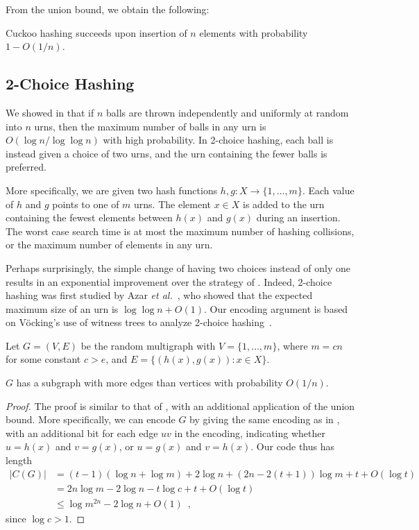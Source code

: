 \documentclass{patmorin}
\begin{document}
From the union bound, we obtain the following:
\begin{cor}
  Cuckoo hashing succeeds upon insertion of $n$ elements with
  probability $1 - O(1/n)$.
\end{cor}

\subsection{2-Choice Hashing}

We showed in  that if $n$ balls are thrown independently
and uniformly at random into $n$ urns, then the maximum number of
balls in any urn is $O(\log n/\log \log n)$ with high probability. In
2-choice hashing, each ball is instead given a choice of two urns, and
the urn containing the fewer balls is preferred.

More specifically, we are given two hash functions
$h, g : X \to \{1, \ldots, m\}$. Each value of $h$ and $g$ points to
one of $m$ urns. The element $x \in X$ is added to the urn containing
the fewest elements between $h(x)$ and $g(x)$ during an insertion. The
worst case search time is at most the maximum number of hashing
collisions, or the maximum number of elements in any urn.

Perhaps surprisingly, the simple change of having two choices instead
of only one results in an exponential improvement over the strategy of
. Indeed, 2-choice hashing was first studied by Azar
\emph{et al.}~\cite{azar:multiplechoice}, who showed that the expected maximum size of an urn is
$\log \log n + O(1)$. Our encoding argument
is based on V\"{o}cking's use of witness trees to analyze 2-choice
hashing~\cite{vocking:witness}.

Let $G = (V, E)$ be the random multigraph with $V = \{1, \ldots, m\}$,
where $m = cn$ for some constant $c > e$, and
$E = \{(h(x), g(x)) : x \in X\}$.

\begin{lem}
  $G$ has a subgraph with more edges than vertices with probability
  $O(1/n)$.
\end{lem}
\begin{proof}
  The proof is similar to that of , with an
  additional application of the union bound. More specifically, we can
  encode $G$ by giving the same encoding as in
  , with an additional bit for each edge $uv$
  in the encoding, indicating whether $u = h(x)$ and $v = g(x)$, or
  $u = g(x)$ and $v = h(x)$. Our code thus has length
  \begin{align*}
    |C(G)| &= (t - 1)(\log n + \log m) + 2 \log n + (2n - 2(t + 1))\log m + t + O(\log t) \\
    &= 2n \log m - 2 \log n - t \log c + t + O(\log t) \\
    &\le \log m^{2n} - 2 \log n + O(1) \enspace ,
  \end{align*}
  since $\log c > 1$.
\end{proof}
\end{document}

